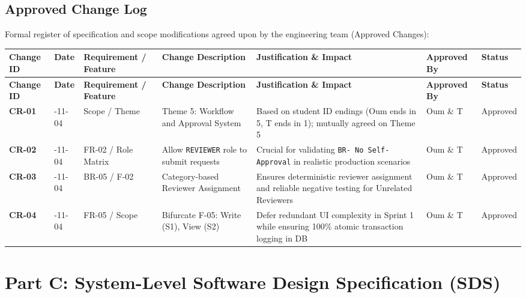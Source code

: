\documentclass[11pt,a4paper]{article}
\begin{document}
\subsection{Approved Change Log}

Formal register of specification and scope modifications agreed upon by the engineering team (Approved Changes):\\


\small
\vspace{0.3em}
\begin{longtable}{|>{\RaggedRight}p{1.3cm}|>{\centering\arraybackslash}p{1.6cm}|>{\RaggedRight}p{1.9cm}|>{\RaggedRight}p{3.0cm}|>{\RaggedRight}p{3.4cm}|>{\centering\arraybackslash}p{1.5cm}|>{\centering\arraybackslash}p{1.2cm}|}
\hline
\rowcolor{zenPale}\textbf{Change ID} & \textbf{Date} & \textbf{Requirement\allowbreak{} / Feature} & \textbf{Change\allowbreak{} Description} & \textbf{Justification\allowbreak{} \& Impact} & \textbf{Approved By} & \textbf{Status} \\ \hline
\endfirsthead
\hline
\rowcolor{zenPale}\textbf{Change ID} & \textbf{Date} & \textbf{Requirement\allowbreak{} / Feature} & \textbf{Change\allowbreak{} Description} & \textbf{Justification\allowbreak{} \& Impact} & \textbf{Approved By} & \textbf{Status} \\ \hline
\endhead
\hline
\endfoot
\textbf{CR-01} & 2026-11-04 & Scope / Theme & Theme 5: Workflow and Approval System & Based on student ID endings (Oum ends in 5, T ends in 1); mutually agreed on Theme 5 & Oum \& T & Approved \\ \hline
\textbf{CR-02} & 2026-11-04 & FR-02 / Role Matrix & Allow \texttt{REVIEWER} role to submit requests & Crucial for validating \texttt{BR-\allowbreak 01 No Self-\allowbreak Approval} in realistic production scenarios & Oum \& T & Approved \\ \hline
\textbf{CR-03} & 2026-11-04 & BR-05 / F-02 & Category-based Reviewer Assignment & Ensures deterministic reviewer assignment and reliable negative testing for Unrelated Reviewers & Oum \& T & Approved \\ \hline
\textbf{CR-04} & 2026-11-04 & FR-05 / Scope & Bifurcate F-05: Write (S1), View (S2) & Defer redundant UI complexity in Sprint 1 while ensuring 100\% atomic transaction logging in DB & Oum \& T & Approved \\ \hline
\end{longtable}
\vspace{0.3em}

\newpage
\section{Part C: System-Level Software Design Specification (SDS)}\label{sec:part-c}
\end{document}
